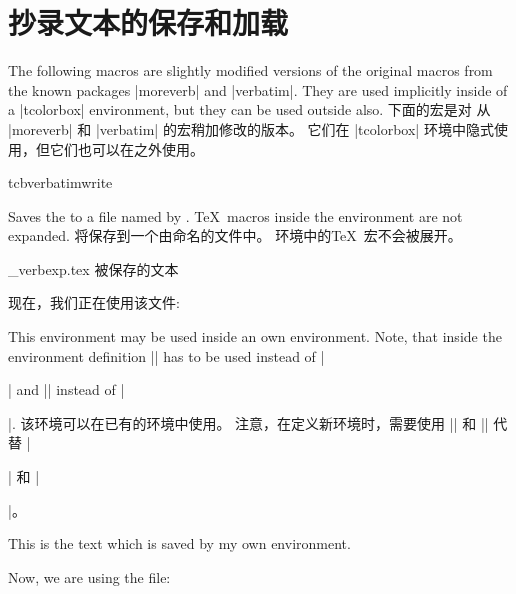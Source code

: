 \section{抄录文本的保存和加载}%
%
\begin{stripedbox}
The following macros are slightly modified versions of the original macros
from the known packages |moreverb| and |verbatim|.
They are used implicitly inside of a |tcolorbox| environment,
but they can be used outside also.
\tcblower
下面的宏是对 从 |moreverb| 和 |verbatim| 的宏稍加修改的版本。%
它们在 |tcolorbox| 环境中隐式使用，但它们也可以在之外使用。
\end{stripedbox}


\begin{docEnvironment}{tcbverbatimwrite}{}
\begin{stripedbox}
Saves the  to a file named by .
\TeX\ macros inside the environment are not expanded.
\tcblower
将保存到一个由命名的文件中。%
环境中的\TeX\ 宏不会被展开。
\end{stripedbox}

\begin{dispExample}
\begin{tcbverbatimwrite}{\jobname_verbexp.tex}
被保存的文本
\end{tcbverbatimwrite}

现在，我们正在使用该文件:\par

\end{dispExample}

\begin{stripedbox}
This environment may be used inside an own environment. Note, that inside
the environment definition |\tcbverbatimwrite| has to be used instead of
|\begin{tcbverbatimwrite}| and |\endtcbverbatimwrite| instead of |\end{tcbverbatimwrite}|.
\tcblower
该环境可以在已有的环境中使用。%
注意，在定义新环境时，需要使用 |\tcbverbatimwrite| 和 |\endtcbverbatimwrite| 代替 |\begin{tcbverbatimwrite}| 和 |\end{tcbverbatimwrite}|。
\end{stripedbox}

\begin{dispExample}
\newenvironment{myverbatim}{%
  \begingroup{}}%
  {\endtcbverbatimwrite\endgroup}

\begin{myverbatim}
  This is the text which is saved by my own environment.
\end{myverbatim}

Now, we are using the file:\par

\end{dispExample}
\end{docEnvironment}

